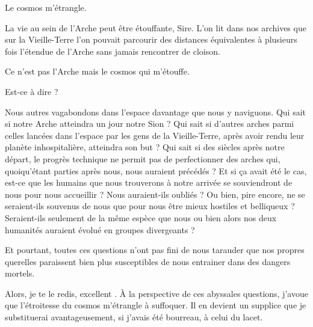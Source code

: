\begin{drama}
  \elenaspeaks Le cosmos m’étrangle.

  \alexasspeaks La vie au sein de l’Arche peut être étouffante, Sire. L’on lit dans nos archives que sur la Vieille-Terre l’on pouvait parcourir des distances équivalentes à plusieurs fois l’étendue de l’Arche sans jamais rencontrer de cloison.

  \elenaspeaks Ce n’est pas l’Arche mais le cosmos qui m’étouffe.

  \alexasspeaks Est-ce à dire ?

  \elenaspeaks Nous autres vagabondons dans l’espace davantage que nous y naviguons. Qui sait si notre Arche atteindra un jour notre Sion ? Qui sait si d’autres arches parmi celles lancées dans l’espace par les gens de la Vieille-Terre, après avoir rendu leur planète inhospitalière, atteindra son but ? Qui sait si des siècles après notre départ, le progrès technique ne permit pas de perfectionner des arches qui, quoiqu’étant parties après nous, nous auraient précédés ? Et si ça avait été le cas, est-ce que les humains que nous trouverons à notre arrivée se souviendront de nous pour nous accueillir ? Nous auraient-ils oubliés ? Ou bien, pire encore, ne se seraient-ils souvenus  de nous que pour nous être mieux hostiles et belliqueux ? Seraient-ils seulement de la même espèce que nous ou bien alors nos deux humanités auraient évolué en groupes divergeants ?

Et pourtant, toutes ces questions n’ont pas fini de nous tarauder que nos propres querelles paraissent bien plus susceptibles de nous entrainer dans des dangers mortels.

  Alors, je te le redis, excellent \alexas. À la perspective de ces abyssales questions, j’avoue que l’étroitesse du cosmos m’étrangle à suffoquer. Il en devient un supplice que je substituerai avantageusement, si j’avais été bourreau, à celui du lacet.
\end{drama}

\scene


\StageDirII{\elena, \roi, \kingsgards}



